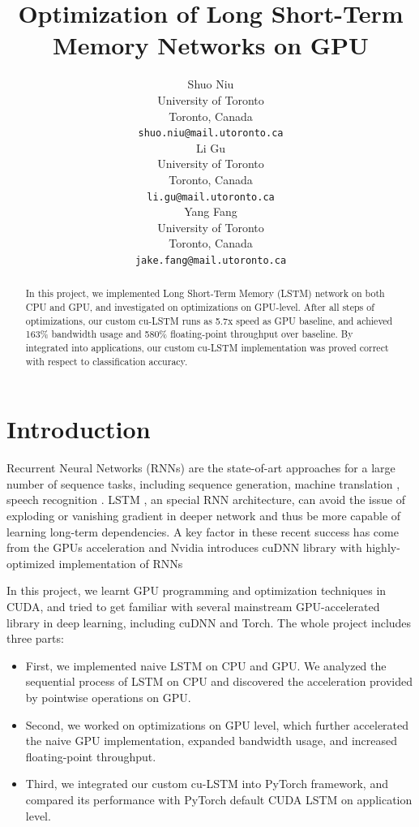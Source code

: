 \documentclass{article}
\title{Optimization of Long Short-Term Memory Networks on GPU}
\author{
  Shuo Niu \\
  University of Toronto \\
  Toronto, Canada \\
  \texttt{shuo.niu@mail.utoronto.ca} \\
  \And
  Li Gu \\
  University of Toronto \\
  Toronto, Canada \\
  \texttt{li.gu@mail.utoronto.ca} \\
  \And
  Yang Fang \\
  University of Toronto \\
  Toronto, Canada \\
  \texttt{jake.fang@mail.utoronto.ca} \\
}
\begin{document}

\maketitle
\begin{abstract}
  In this project, we implemented Long Short-Term Memory (LSTM) network on both CPU and GPU, and investigated on optimizations on GPU-level. After all steps of optimizations, our custom cu-LSTM runs as 5.7x speed as GPU baseline, and achieved 163\% bandwidth usage and 580\% floating-point throughput over baseline.  By integrated into applications, our custom cu-LSTM implementation was proved correct with respect to classification accuracy.
\end{abstract}

\section{Introduction}


Recurrent Neural Networks (RNNs) are the state-of-art approaches for a large number of sequence tasks, including sequence generation\cite{eck2002first,sutskever2014sequence,gravessupervised}, machine translation \cite{cho2014learning,jean2015montreal,luong2015effective}, speech recognition \cite{graves2013speech}. LSTM \cite{hochreiter1997long}, an special RNN architecture, can avoid the issue of exploding or vanishing gradient \cite{pascanu2013difficulty} in deeper network and thus be more capable of learning long-term dependencies. A key factor in these recent success has come from the GPUs acceleration \cite{leonard2015rnn,weninger2015introducing} and Nvidia introduces cuDNN library\cite{chetlur2014cudnn} with highly-optimized implementation of RNNs\cite{appleyard2016optimizing} 

In this project, we learnt GPU programming and optimization techniques in CUDA, and tried to get familiar with several mainstream GPU-accelerated library in deep learning, including cuDNN and Torch. The whole project includes three parts:


\begin{itemize}
  \item First, we implemented naive LSTM on CPU and GPU. We analyzed the sequential process of LSTM on CPU and discovered the acceleration provided by pointwise operations on GPU.
  \item Second, we worked on optimizations on GPU level, which further accelerated the naive GPU implementation, expanded bandwidth usage, and increased floating-point throughput. 
  \item Third, we integrated our custom cu-LSTM into PyTorch framework, and compared its performance with PyTorch default CUDA LSTM on application level.
\end{itemize}
\end{document}
